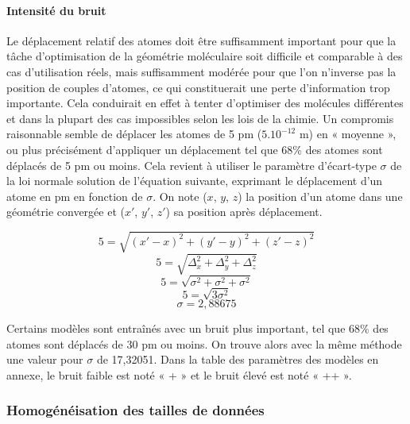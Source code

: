 \paragraph{Intensité du bruit} Le déplacement relatif des atomes doit être suffisamment important pour que la tâche d'optimisation de la géométrie moléculaire soit difficile et comparable à des cas d'utilisation réels, mais suffisamment modérée pour que l'on n'inverse pas la position de couples d'atomes, ce qui constituerait une perte d'information trop importante. Cela conduirait en effet à tenter d'optimiser des molécules différentes et dans la plupart des cas impossibles selon les lois de la chimie. Un compromis raisonnable semble de déplacer les atomes de 5 pm ($5.10^{-12}$ m) en « moyenne », ou plus précisément d'appliquer un déplacement tel que 68\% des atomes sont déplacés de 5 pm ou moins. Cela revient à utiliser le paramètre d'écart-type $\sigma$ de la loi normale solution de l'équation suivante, exprimant le déplacement d'un atome en pm en fonction de $\sigma$. On note ($x$, $y$, $z$) la position d'un atome dans une géométrie convergée et ($x'$, $y'$, $z'$) sa position après déplacement.

\vspace{0.7cm}

\[
	5 = \sqrt{(x'-x)^2 + (y'-y)^2 + (z'-z)^2}
\]
\[
	5 = \sqrt{\Delta_x^2 + \Delta_y^2 + \Delta_z^2}
\]
\[
	5 = \sqrt{\sigma^2 + \sigma^2 + \sigma^2}
\]
\[
	5 = \sqrt{3\sigma^2}
\]
\[
	\sigma = 2,88675
\]

\vspace{0.7cm}

Certains modèles sont entraînés avec un bruit plus important, tel que 68\% des atomes sont déplacés de 30 pm ou moins. On trouve alors avec la même méthode une valeur pour $\sigma$ de 17,32051. Dans la table des paramètres des modèles en annexe, le bruit faible est noté « + » et le bruit élevé est noté « ++ ».

\subsubsection{Homogénéisation des tailles de données}

\label{delta_dist_homogen}

